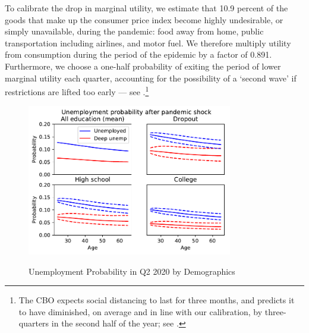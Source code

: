 \documentclass[titlepage]{\econtex}
\begin{document}
To calibrate the drop in marginal utility, we estimate that 10.9 percent of the goods that make up the consumer price index become highly undesirable, or simply unavailable, during the pandemic: food away from home, public transportation including airlines, and motor fuel.
We therefore multiply utility from consumption during the period of the epidemic by a factor of 0.891.
Furthermore, we choose a one-half probability of exiting the period of lower marginal utility each quarter, accounting for the possibility of a `second wave' if restrictions are lifted too early --- see \cite{cyranoski_we_2020}.\footnote{The CBO expects social distancing to last for three months, and predicts it to have diminished, on average and in line with our calibration, by three-quarters in the second half of the year; see \cite{SwagelCBO2020}.}

\begin{figure}
  \centering
  \caption{Unemployment Probability in Q2 2020 by Demographics}
  \label{unemployment_demographics}
  { \includegraphics[width=0.8\textwidth]{./Figures/UnempProbByDemogBasic}}
\end{figure}
\end{document}
